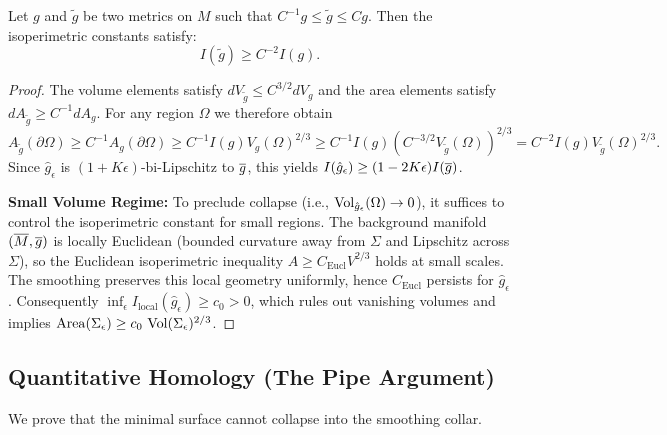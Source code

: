 \begin{lemma}
Let $g$ and $\tilde{g}$ be two metrics on $M$ such that $C^{-1} g \le \tilde{g} \le C g$. Then the isoperimetric constants satisfy:
\[ I(\tilde{g}) \ge C^{-2} I(g). \]
\end{lemma}
\begin{proof}
The volume elements satisfy $dV_{\tilde{g}} \le C^{3/2} dV_g$ and the area elements satisfy $dA_{\tilde{g}} \ge C^{-1} dA_g$. For any region $\Omega$ we therefore obtain
\[ A_{\tilde{g}}(\partial \Omega) \ge C^{-1} A_g(\partial \Omega) \ge C^{-1} I(g) V_g(\Omega)^{2/3} \ge C^{-1} I(g) (C^{-3/2} V_{\tilde{g}}(\Omega))^{2/3} = C^{-2} I(g) V_{\tilde{g}}(\Omega)^{2/3}. \]
Since $\hat{g}_\epsilon$ is $(1+K\epsilon)$-bi-Lipschitz to $\overline{g}$, this yields $I(\hat{g}_\epsilon) \ge (1-2K\epsilon) I(\overline{g})$.

\textbf{Small Volume Regime:} To preclude collapse (i.e., $\operatorname{Vol}_{\hat{g}_\epsilon}(\Omega) \to 0$), it suffices to control the isoperimetric constant for small regions. The background manifold $(\overline{M}, \overline{g})$ is locally Euclidean (bounded curvature away from $\Sigma$ and Lipschitz across $\Sigma$), so the Euclidean isoperimetric inequality $A \ge C_{\mathrm{Eucl}} V^{2/3}$ holds at small scales. The smoothing preserves this local geometry uniformly, hence $C_{\mathrm{Eucl}}$ persists for $\hat{g}_\epsilon$. Consequently $\inf_\epsilon I_{\mathrm{local}}(\hat{g}_\epsilon) \ge c_0 > 0$, which rules out vanishing volumes and implies $\mathrm{Area}(\Sigma_\epsilon) \ge c_0 \, \operatorname{Vol}(\Sigma_\epsilon)^{2/3}$.
\end{proof}

\subsection{Quantitative Homology (The Pipe Argument)}
We prove that the minimal surface cannot collapse into the smoothing collar.

